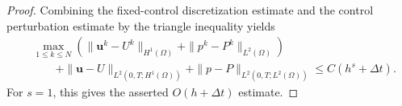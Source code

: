\documentclass[10pt,a4paper]{amsart}
\begin{document}
\begin{proof}
Combining the fixed-control discretization estimate and the control
perturbation estimate by the triangle inequality yields
\[
\begin{aligned}
&\max_{1\le k\le N}
\left(
\|\boldsymbol u^k-U^k\|_{H^1(\Omega)}
+
\|p^k-P^k\|_{L^2(\Omega)}
\right)
\\
&\qquad
+
\|\boldsymbol u-U\|_{L^2(0,T;H^1(\Omega))}
+
\|p-P\|_{L^2(0,T;L^2(\Omega))}
\le
C(h^s+\Delta t).
\end{aligned}
\]
For $s=1$, this gives the asserted $O(h+\Delta t)$ estimate.
\end{proof}
\end{document}
